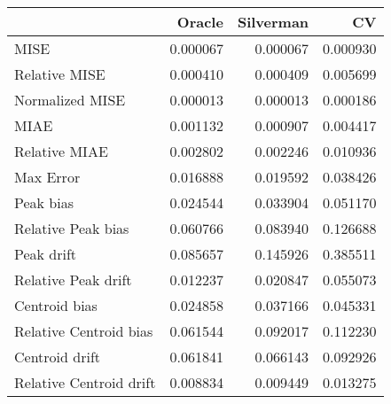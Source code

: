 \begin{tabular}{lrrr}
  \hline
 & Oracle & Silverman & CV \\ 
  \hline
MISE & 0.000067 & 0.000067 & 0.000930 \\ 
  Relative MISE & 0.000410 & 0.000409 & 0.005699 \\ 
  Normalized MISE & 0.000013 & 0.000013 & 0.000186 \\ 
  MIAE & 0.001132 & 0.000907 & 0.004417 \\ 
  Relative MIAE & 0.002802 & 0.002246 & 0.010936 \\ 
  Max Error & 0.016888 & 0.019592 & 0.038426 \\ 
  Peak bias & 0.024544 & 0.033904 & 0.051170 \\ 
  Relative Peak bias & 0.060766 & 0.083940 & 0.126688 \\ 
  Peak drift & 0.085657 & 0.145926 & 0.385511 \\ 
  Relative Peak drift & 0.012237 & 0.020847 & 0.055073 \\ 
  Centroid bias & 0.024858 & 0.037166 & 0.045331 \\ 
  Relative Centroid bias & 0.061544 & 0.092017 & 0.112230 \\ 
  Centroid drift & 0.061841 & 0.066143 & 0.092926 \\ 
  Relative Centroid drift & 0.008834 & 0.009449 & 0.013275 \\ 
   \hline
\end{tabular}
